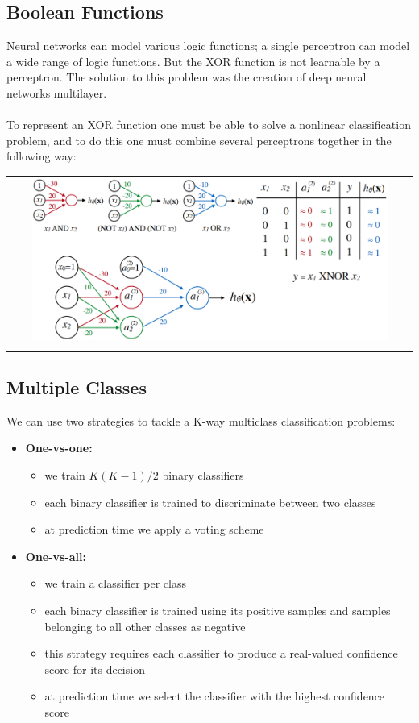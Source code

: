 \subsection{Boolean Functions}
Neural networks can model various logic functions; a single perceptron can model a wide range of logic functions.
But the XOR function is not learnable by a perceptron.
The solution to this problem was the creation of deep neural networks multilayer. \\ \\
To represent an XOR function one must be able to solve a nonlinear classification problem, and to do this one must combine several perceptrons together in the following way:
\begin{center}
    \begin{tabular}{c}
        \\ \includegraphics[width=0.9\textwidth]{images/NeuralNetworks4.png} \\ \\
    \end{tabular}
\end{center}

\subsection{Multiple Classes}
We can use two strategies to tackle a K-way multiclass classification problems:
\begin{itemize}
    \item \textbf{One-vs-one:}
    \begin{itemize}
        \item we train $K(K-1)/2$ binary classifiers
        \item each binary classifier is trained to discriminate between two classes
        \item at prediction time we apply a voting scheme
    \end{itemize}
    \item \textbf{One-vs-all:}
    \begin{itemize}
        \item we train a classifier per class
        \item each binary classifier is trained using its positive samples and samples belonging to all other classes as negative
        \item this strategy requires each classifier to produce a real-valued confidence score for its decision
        \item at prediction time we select the classifier with the highest confidence score
    \end{itemize}
\end{itemize}

